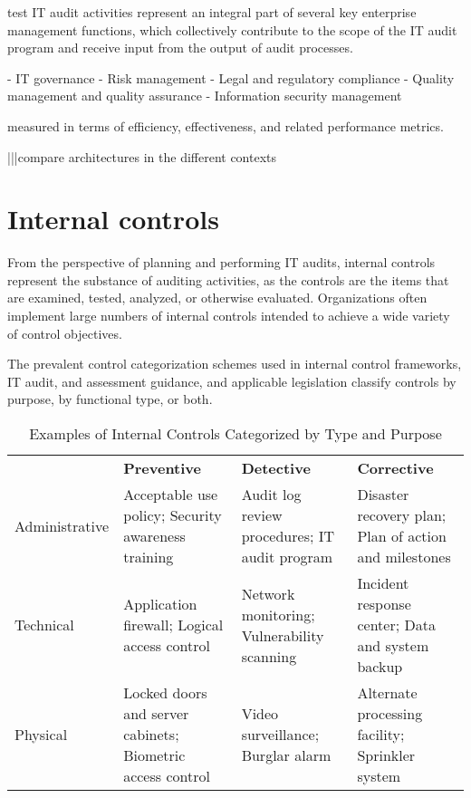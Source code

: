  {test}
IT audit activities represent an integral part of several key enterprise management
functions, which collectively contribute to the scope of the IT audit program and receive
input from the output of audit processes.

- IT governance
- Risk management
- Legal and regulatory compliance
- Quality management and quality assurance
- Information security management

measured in terms of efficiency, effectiveness, and related performance metrics. 

|||compare architectures in the different contexts

\section{Internal controls}

From the perspective of planning and performing IT audits, internal controls
represent the substance of auditing activities, as the controls are the items that are
examined, tested, analyzed, or otherwise evaluated. Organizations often implement
large numbers of internal controls intended to achieve a wide variety of control
objectives.

The prevalent control categorization schemes used in internal control frameworks,
IT audit, and assessment guidance, and applicable legislation classify controls by
purpose, by functional type, or both.

\begin{table}[h!]
  \begin{center}
    \caption{Examples of Internal Controls Categorized by Type and Purpose}
    \label{tab:table1}
    \def\arraystretch{1.5}
    \begin{tabularx}{\linewidth}{|l X X X |}
      \hline
      \rowcolor{gray!20}
      \textbf{} & \textbf{Preventive} & \textbf{Detective} & \textbf{Corrective}\\
      Administrative & Acceptable use policy; Security awareness training & Audit log review procedures; IT audit program & Disaster recovery plan; Plan of action and milestones\\
      Technical & Application firewall; Logical access control & Network monitoring; Vulnerability scanning & Incident response center; Data and system backup\\
      Physical & Locked doors and server cabinets; Biometric access control& Video surveillance; Burglar alarm & Alternate processing facility; Sprinkler system\\
      \hline
    \end{tabularx}
  \end{center}
\end{table}

